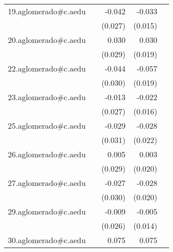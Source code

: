 {\begin{longtable}{l*{4}{D{.}{.}{-1}}}
\addlinespace
19.aglomerado#c.aedu&                     &      -0.042         &      -0.033\sym{*}  &                     \\
            &                     &     (0.027)         &     (0.015)         &                     \\
\addlinespace
20.aglomerado#c.aedu&                     &       0.030         &       0.030         &                     \\
            &                     &     (0.029)         &     (0.019)         &                     \\
\addlinespace
22.aglomerado#c.aedu&                     &      -0.044         &      -0.057\sym{**} &                     \\
            &                     &     (0.030)         &     (0.019)         &                     \\
\addlinespace
23.aglomerado#c.aedu&                     &      -0.013         &      -0.022         &                     \\
            &                     &     (0.027)         &     (0.016)         &                     \\
\addlinespace
25.aglomerado#c.aedu&                     &      -0.029         &      -0.028         &                     \\
            &                     &     (0.031)         &     (0.022)         &                     \\
\addlinespace
26.aglomerado#c.aedu&                     &       0.005         &       0.003         &                     \\
            &                     &     (0.029)         &     (0.020)         &                     \\
\addlinespace
27.aglomerado#c.aedu&                     &      -0.027         &      -0.028         &                     \\
            &                     &     (0.030)         &     (0.020)         &                     \\
\addlinespace
29.aglomerado#c.aedu&                     &      -0.009         &      -0.005         &                     \\
            &                     &     (0.026)         &     (0.014)         &                     \\
\addlinespace
30.aglomerado#c.aedu&                     &       0.075\sym{*}  &       0.075\sym{***}&                     \\

\end{longtable}}
